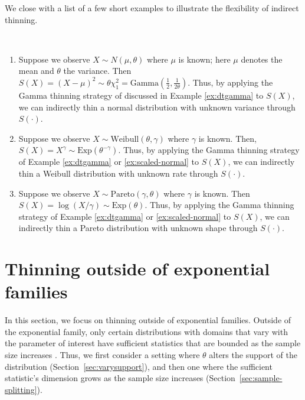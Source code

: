 \documentclass[12pt]{article}
\begin{document}
We close with a list of a few short examples to illustrate the flexibility of indirect thinning. 

\begin{exmp}
\label{ex:other}
\textcolor{white}{.}
\begin{enumerate}
    \item Suppose we observe $X\sim N(\mu,\theta)$ where $\mu$ is known; here $\mu$ denotes the mean and $\theta$ the variance. Then $S(X)=(X-\mu)^2\sim\theta\chi_1^2=\text{Gamma}\left(\frac{1}{2},\frac{1}{2\theta}\right)$. Thus, by applying the Gamma thinning strategy of \cite{neufeld2023data} discussed in Example \ref{ex:dtgamma} to $S(X)$, we can indirectly thin a normal distribution with unknown variance through $S(\cdot)$. \label{ex:normal-unknown-variance}
    \item Suppose we observe $X\sim\text{Weibull}(\theta, \gamma)$ where $\gamma$ is known. Then, $S(X)=X^\gamma\sim\text{Exp}\left(\theta^{-\gamma}\right)$. Thus, by applying the Gamma thinning strategy of Example \ref{ex:dtgamma} or \ref{ex:scaled-normal} to $S(X)$, we can indirectly thin a Weibull distribution with unknown rate through $S(\cdot)$.
    \item Suppose we observe $X\sim\text{Pareto}(\gamma,\theta)$ where $\gamma$ is known. Then $S(X)=\log \left( X/\gamma \right) \sim\text{Exp}(\theta)$. Thus, by applying the Gamma thinning strategy of Example \ref{ex:dtgamma} or \ref{ex:scaled-normal} to $S(X)$, we can indirectly thin a Pareto distribution with unknown shape through $S(\cdot)$. 
\end{enumerate}
\end{exmp}





\section{Thinning outside of exponential families}
\label{sec:outside-exp-fam}

In this section, we focus on thinning outside of exponential families.
Outside of the exponential family, only certain distributions with domains that vary with the parameter of interest have sufficient statistics that are bounded as the sample size increases \citep{darmois, koopman, pitman_1936}. 
Thus, we first consider a setting where $\theta$ alters the support of the distribution (Section~\ref{sec:varysupport}), and then one where the sufficient statistic's dimension grows as the sample size increases (Section~\ref{sec:sample-splitting}). 
\end{document}
